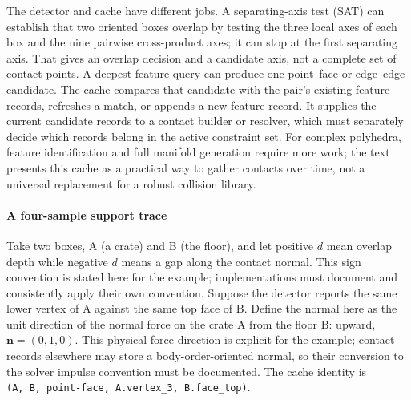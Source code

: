 The detector and cache have different jobs. A separating-axis test (SAT) can establish that two oriented boxes overlap by testing the three local axes of each box and the nine pairwise cross-product axes; it can stop at the first separating axis. That gives an overlap decision and a candidate axis, not a complete set of contact points. A deepest-feature query can produce one point--face or edge--edge candidate. The cache compares that candidate with the pair's existing feature records, refreshes a match, or appends a new feature record. It supplies the current candidate records to a contact builder or resolver, which must separately decide which records belong in the active constraint set. For complex polyhedra, feature identification and full manifold generation require more work; the text presents this cache as a practical way to gather contacts over time, not a universal replacement for a robust collision library.

\paragraph{A four-sample support trace}\label{a-four-sample-support-trace}

Take two boxes, A (a crate) and B (the floor), and let positive \(d\) mean overlap depth while negative \(d\) means a gap along the contact normal. This sign convention is stated here for the example; implementations must document and consistently apply their own convention. Suppose the detector reports the same lower vertex of A against the same top face of B. Define the normal here as the unit direction of the normal force on the crate A from the floor B: upward, \(\mathbf n=(0,1,0)\). This physical force direction is explicit for the example; contact records elsewhere may store a body-order-oriented normal, so their conversion to the solver impulse convention must be documented. The cache identity is \texttt{(A,\ B,\ point-face,\ A.vertex\_3,\ B.face\_top)}.

